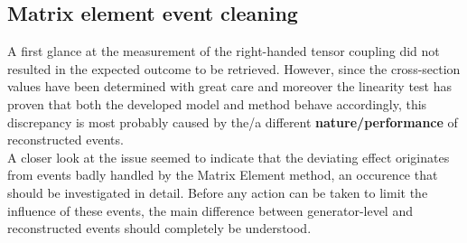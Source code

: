 \subsection{Matrix element event cleaning} \label{subsec::EvtCleaning}

A first glance at the measurement of the right-handed tensor coupling did not resulted in the expected outcome to be retrieved.
However, since the cross-section values have been determined with great care and moreover the linearity test has proven that both the developed model and method behave accordingly, this discrepancy is most probably caused by the/a different \textbf{nature/performance} of reconstructed events.
\\

A closer look at the issue seemed to indicate that the deviating effect originates from events badly handled by the Matrix Element method, an occurence that should be investigated in detail.
Before any action can be taken to limit the influence of these events, the main difference between generator-level and reconstructed events should completely be understood.
%

